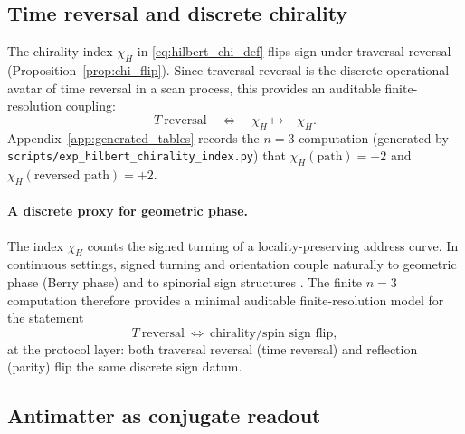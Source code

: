 \subsection{Time reversal and discrete chirality}
\label{subsec:time_reversal_chi}

The chirality index $\chi_H$ in \eqref{eq:hilbert_chi_def} flips sign under traversal reversal (Proposition~\ref{prop:chi_flip}).
Since traversal reversal is the discrete operational avatar of time reversal in a scan process, this provides an auditable finite-resolution coupling:
\[
T\ \text{reversal} \quad\Longleftrightarrow\quad \chi_H\mapsto -\chi_H.
\]
Appendix~\ref{app:generated_tables} records the $n=3$ computation (generated by \texttt{scripts/exp\_hilbert\_chirality\_index.py}) that $\chi_H(\text{path})=-2$ and $\chi_H(\text{reversed path})=+2$.

\paragraph{A discrete proxy for geometric phase.}
The index $\chi_H$ counts the signed turning of a locality-preserving address curve.
In continuous settings, signed turning and orientation couple naturally to geometric phase (Berry phase) and to spinorial sign structures \cite{Berry1984,Nakahara2003}.
The finite $n=3$ computation therefore provides a minimal auditable finite-resolution model for the statement
\[
T\ \text{reversal}\ \Longleftrightarrow\ \text{chirality/spin sign flip},
\]
at the protocol layer: both traversal reversal (time reversal) and reflection (parity) flip the same discrete sign datum.

\subsection{Antimatter as conjugate readout}
\label{subsec:antimatter_duality}

